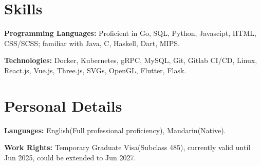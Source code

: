 \documentclass[letterpaper,11pt]{article}
\newcommand{\resumeSubHeadingListStart}{\begin{itemize}[leftmargin=0.15in, label={}]}
\newcommand{\resumeSubHeadingListEnd}{\end{itemize}}
\begin{document}
\section{Skills}
  \vspace{2pt}
  \resumeSubHeadingListStart
    \small{\item{
        
        \textbf{Programming Languages:}{ Proficient in Go, SQL, Python, Javascipt, HTML, CSS/SCSS; familiar with Java, C, Haskell, Dart, MIPS.} \\ \vspace{3pt}
        
        \textbf{Technologies:}{ Docker, Kubernetes, gRPC, MySQL, Git, Gitlab CI/CD, Linux, React.js, Vue.js, Three.js, SVGs, OpenGL, Flutter, Flask.} \\ \vspace{3pt}
        
    }}
  \resumeSubHeadingListEnd




\section{Personal Details}
  \vspace{2pt}
  \resumeSubHeadingListStart
    \small{\item{
        
        \textbf{Languages:}{ English(Full professional proficiency), Mandarin(Native).} \\ \vspace{3pt}
        
        \textbf{Work Rights:}{ Temporary Graduate Visa(Subclass 485), currently valid until Jun 2025, could be extended to Jun 2027.} \\ \vspace{3pt}
        
    }}
  \resumeSubHeadingListEnd






\end{document}
